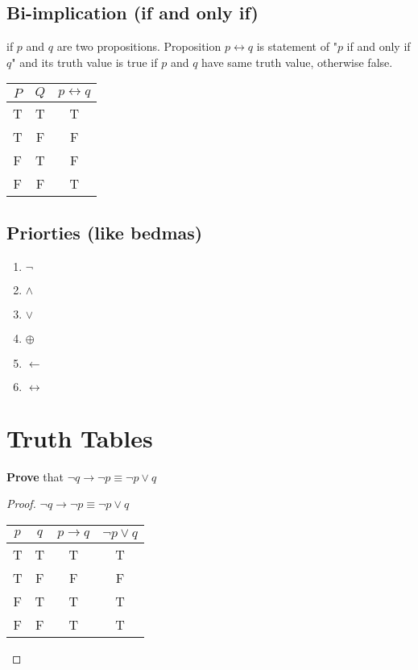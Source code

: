 \documentclass[11pt]{article}
\theoremstyle{definition}
\begin{document}
\subsection{Bi-implication (if and only if)}
if $p$ and $q$ are two propositions. Proposition $p \longleftrightarrow q$ is statement of "$p$ if and only if$q$" and its truth value is true if $p$ and $q$ have same truth value, otherwise false. 
\begin{center}
	\begin{tabular}{ |c|c|c|} 
 		\hline
 		$P$ & $Q$ & $p \longleftrightarrow q$  \\
		\hline
 		T & T  & T \\
 		T & F & F \\
		F & T & F \\
		F & F & T \\
 		\hline
	\end{tabular}
\end{center}
\subsection{Priorties (like bedmas)} 
\begin{enumerate}
\item $\neg$
\item $\land$
\item $\lor$
\item $\oplus$
\item $\leftarrow$
\item $\longleftrightarrow$
\end{enumerate}

\section{Truth Tables}
\textbf{Prove} that  $\neg q \rightarrow \neg p \equiv \neg p \lor q$

\begin{proof} $\neg q \rightarrow \neg p \equiv \neg p \lor q$
\begin{center}
	\begin{tabular}{ |c|c|c|c|} 
 		\hline
 		$p$ & $q$ & $p \rightarrow q$ & $\neg p \lor q$ \\
		\hline
 		T & T  & T & T\\
 		T & F & F & F\\
		F & T & T & T \\
		F & F & T & T\\
 		\hline
	\end{tabular}
\end{center}
\end{proof}
\end{document}
